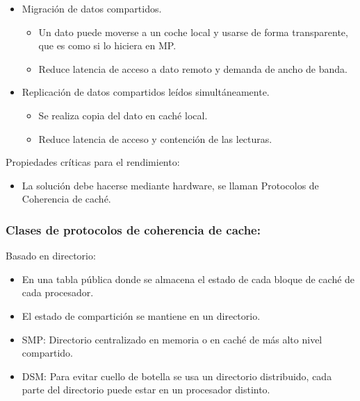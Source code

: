 \documentclass[12pt, twoside, openright]{report} %
\begin{document}
      \begin{itemize}
      
      \item
        Migración de datos compartidos.

        \begin{itemize}
        
        \item
          Un dato puede moverse a un coche local y usarse de forma
          transparente, que es como si lo hiciera en MP.
        \item
          Reduce latencia de acceso a dato remoto y demanda de ancho
          de banda.
        \end{itemize}
      \item
        Replicación de datos compartidos leídos simultáneamente.

        \begin{itemize}
        
        \item
          Se realiza copia del dato en caché local.
        \item
          Reduce latencia de acceso y contención de las lecturas.
        \end{itemize}
      \end{itemize}

      Propiedades críticas para el rendimiento:

      \begin{itemize}
      
      \item
        La solución debe hacerse mediante hardware, se llaman
        Protocolos de Coherencia de caché.
      \end{itemize}

\subsubsection{Clases de protocolos de coherencia de cache:}
      Basado en directorio:

      \begin{itemize}
      
      \item
        En una tabla pública donde se almacena el estado de cada
        bloque de caché de cada procesador.
      \item
        El estado de compartición se mantiene en un directorio.
      \item
        SMP: Directorio centralizado en memoria o en caché de más alto
        nivel compartido.
      \item
        DSM: Para evitar cuello de botella se usa un directorio
        distribuido, cada parte del directorio puede estar en un
        procesador distinto.
      \end{itemize}
\end{document}
